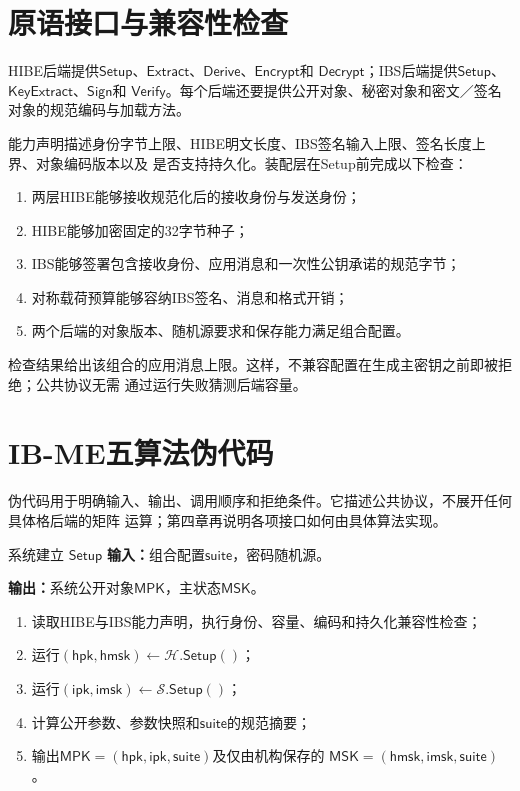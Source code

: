\section{原语接口与兼容性检查}

HIBE后端提供$\mathsf{Setup}$、$\mathsf{Extract}$、$\mathsf{Derive}$、$\mathsf{Encrypt}$和
$\mathsf{Decrypt}$；IBS后端提供$\mathsf{Setup}$、$\mathsf{KeyExtract}$、$\mathsf{Sign}$和
$\mathsf{Verify}$。每个后端还要提供公开对象、秘密对象和密文／签名对象的规范编码与加载方法。

能力声明描述身份字节上限、HIBE明文长度、IBS签名输入上限、签名长度上界、对象编码版本以及
是否支持持久化。装配层在Setup前完成以下检查：

\begin{enumerate}
  \item 两层HIBE能够接收规范化后的接收身份与发送身份；
  \item HIBE能够加密固定的32字节种子；
  \item IBS能够签署包含接收身份、应用消息和一次性公钥承诺的规范字节；
  \item 对称载荷预算能够容纳IBS签名、消息和格式开销；
  \item 两个后端的对象版本、随机源要求和保存能力满足组合配置。
\end{enumerate}

检查结果给出该组合的应用消息上限。这样，不兼容配置在生成主密钥之前即被拒绝；公共协议无需
通过运行失败猜测后端容量。

\section{IB-ME五算法伪代码}

伪代码用于明确输入、输出、调用顺序和拒绝条件。它描述公共协议，不展开任何具体格后端的矩阵
运算；第四章再说明各项接口如何由具体算法实现。

\begin{ibmealgorithm}{系统建立 $\mathsf{Setup}$}
\label{alg:setup}
\textbf{输入：}组合配置$\mathsf{suite}$，密码随机源。\par
\textbf{输出：}系统公开对象$\mathsf{MPK}$，主状态$\mathsf{MSK}$。
\begin{enumerate}
  \item 读取HIBE与IBS能力声明，执行身份、容量、编码和持久化兼容性检查；
  \item 运行$(\mathsf{hpk},\mathsf{hmsk})\leftarrow\mathcal H.\mathsf{Setup}()$；
  \item 运行$(\mathsf{ipk},\mathsf{imsk})\leftarrow\mathcal S.\mathsf{Setup}()$；
  \item 计算公开参数、参数快照和$\mathsf{suite}$的规范摘要；
  \item 输出$\mathsf{MPK}=(\mathsf{hpk},\mathsf{ipk},\mathsf{suite})$及仅由机构保存的
        $\mathsf{MSK}=(\mathsf{hmsk},\mathsf{imsk},\mathsf{suite})$。
\end{enumerate}
\end{ibmealgorithm}

